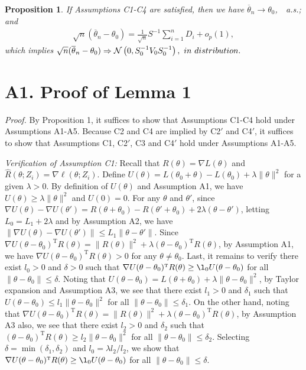 \documentclass[twoside,11pt]{article}
\def\trans{^{ \mathrm{\scriptscriptstyle T} }}
\def\wh{\widehat}
\def\ol{\overline}
\begin{document}
{\bf Proposition 1}. {\it If Assumptions C1-C4 are satisfied, then we have $\ol{\theta}_n\rightarrow\theta_0$,\ \ a.s.; and
	\begin{eqnarray}\label{sum-martingale-0}
	\sqrt{n}(\ol{\theta}_n-\theta_0)=\frac{1}{\sqrt{n}}S^{-1}\sum_{i=1}^n D_i+ o_p(1),
	\end{eqnarray}
	which implies $\sqrt{n}(\ol{\theta}_n-\theta_0) \Rightarrow \mathcal{N}\left(0, S_0^{-1}V_0S_0^{-1}\right), {\mbox \ in \ distribution.}$ }


\section*{A1. Proof of Lemma 1}

{\it Proof.} By Proposition 1, it suffices to show that Assumptions C1-C4 hold under Assumptions A1-A5. Because C2 and C4 are implied by C2$'$ and C4$'$, it suffices to show that Assumptions C1, C2$'$, C3 and C4$'$ hold under Assumptions A1-A5.

{\it Verification of Assumption C1:} Recall that $R(\theta)=\nabla L(\theta)$ and $\wh{R}(\theta; Z_i)=\nabla \ell(\theta; Z_i)$. Define $U(\theta)=L(\theta_0+\theta)-L(\theta_0)+\lambda\|\theta\|^2$ for a given $\lambda>0$. By definition of $U(\theta)$ and Assumption A1, we have $U(\theta)\geq \lambda \|\theta\|^2$ and $U(0)=0$. For any $\theta$ and $\theta'$, since $\nabla U(\theta)-\nabla U(\theta')=R(\theta+\theta_0)-R(\theta'+\theta_0)+2\lambda(\theta-\theta')$, letting $L_0=L_1+2\lambda$ and by Assumption A2, we have $\|\nabla U(\theta)-\nabla U(\theta')\|\leq L_1\|\theta-\theta'\|$. Since $\nabla U(\theta-\theta_0)\trans R(\theta)=\|R(\theta)\|^2+\lambda (\theta-\theta_0)\trans R(\theta)$, by Assumption A1, we have $\nabla U(\theta-\theta_0)\trans R(\theta)>0$ for any $\theta\neq \theta_0$. Last, it remains to verify there exist $l_0>0$ and $\delta>0$ such that $\nabla U(\theta-\theta_0)\trans R(\theta)\geq \l_0 U(\theta-\theta_0)$ for all $\|\theta-\theta_0\|\leq \delta$. Noting that $U(\theta-\theta_0)=L(\theta+\theta_0)+\lambda\|\theta-\theta_0\|^2$, by Taylor expansion and Assumption A3, we see that there exist $l_1>0$ and $\delta_1$ such that $U(\theta-\theta_0)\leq l_1 \|\theta-\theta_0\|^2$ for all $\|\theta-\theta_0\|\leq \delta_1$. On the other hand, noting that $\nabla U(\theta-\theta_0)\trans R(\theta)=\|R(\theta)\|^2 + \lambda(\theta-\theta_0)\trans R(\theta)$, by Assumption A3 also, we see that there exist $l_2>0$ and $\delta_2$ such that $(\theta-\theta_0)\trans R(\theta)\geq l_2 \|\theta-\theta_0\|^2$ for all $\|\theta-\theta_0\|\leq \delta_2$. Selecting $\delta=\min(\delta_1, \delta_2)$ and $l_0=\lambda l_2/l_2$, we show that $\nabla U(\theta-\theta_0)\trans R(\theta)\geq \l_0 U(\theta-\theta_0)$ for all $\|\theta-\theta_0\|\leq \delta$.
\end{document}
